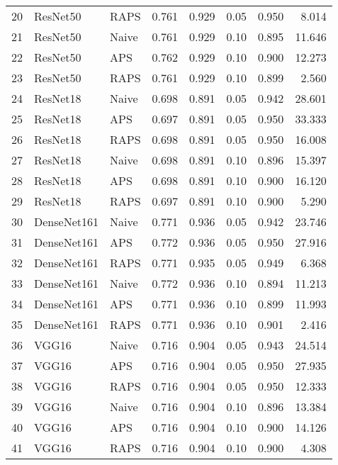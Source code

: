 \begin{tabular}{lllrrrrr}
20 &     ResNet50 &      RAPS &  0.761 &  0.929 &   0.05 &     0.950 &   8.014 \\
21 &     ResNet50 &     Naive &  0.761 &  0.929 &   0.10 &     0.895 &  11.646 \\
22 &     ResNet50 &       APS &  0.762 &  0.929 &   0.10 &     0.900 &  12.273 \\
23 &     ResNet50 &      RAPS &  0.761 &  0.929 &   0.10 &     0.899 &   2.560 \\
24 &     ResNet18 &     Naive &  0.698 &  0.891 &   0.05 &     0.942 &  28.601 \\
25 &     ResNet18 &       APS &  0.697 &  0.891 &   0.05 &     0.950 &  33.333 \\
26 &     ResNet18 &      RAPS &  0.698 &  0.891 &   0.05 &     0.950 &  16.008 \\
27 &     ResNet18 &     Naive &  0.698 &  0.891 &   0.10 &     0.896 &  15.397 \\
28 &     ResNet18 &       APS &  0.698 &  0.891 &   0.10 &     0.900 &  16.120 \\
29 &     ResNet18 &      RAPS &  0.697 &  0.891 &   0.10 &     0.900 &   5.290 \\
30 &  DenseNet161 &     Naive &  0.771 &  0.936 &   0.05 &     0.942 &  23.746 \\
31 &  DenseNet161 &       APS &  0.772 &  0.936 &   0.05 &     0.950 &  27.916 \\
32 &  DenseNet161 &      RAPS &  0.771 &  0.935 &   0.05 &     0.949 &   6.368 \\
33 &  DenseNet161 &     Naive &  0.772 &  0.936 &   0.10 &     0.894 &  11.213 \\
34 &  DenseNet161 &       APS &  0.771 &  0.936 &   0.10 &     0.899 &  11.993 \\
35 &  DenseNet161 &      RAPS &  0.771 &  0.936 &   0.10 &     0.901 &   2.416 \\
36 &        VGG16 &     Naive &  0.716 &  0.904 &   0.05 &     0.943 &  24.514 \\
37 &        VGG16 &       APS &  0.716 &  0.904 &   0.05 &     0.950 &  27.935 \\
38 &        VGG16 &      RAPS &  0.716 &  0.904 &   0.05 &     0.950 &  12.333 \\
39 &        VGG16 &     Naive &  0.716 &  0.904 &   0.10 &     0.896 &  13.384 \\
40 &        VGG16 &       APS &  0.716 &  0.904 &   0.10 &     0.900 &  14.126 \\
41 &        VGG16 &      RAPS &  0.716 &  0.904 &   0.10 &     0.900 &   4.308 \\

\end{tabular}
